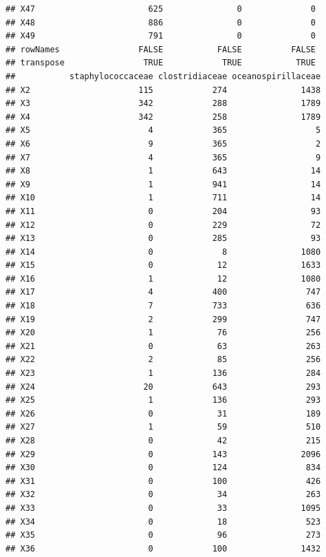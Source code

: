 \documentclass[12pt]{beamer}\usepackage[]{graphicx}\usepackage[]{color}
\makeatletter
\newenvironment{kframe}{%
 \def\at@end@of@kframe{}%
 \ifinner\ifhmode%
  \def\at@end@of@kframe{\end{minipage}}%
  \begin{minipage}{\columnwidth}%
 \fi\fi%
 \def\FrameCommand##1{\hskip\@totalleftmargin \hskip-\fboxsep
 \colorbox{shadecolor}{##1}\hskip-\fboxsep
     \hskip-\linewidth \hskip-\@totalleftmargin \hskip\columnwidth}%
 \MakeFramed {\advance\hsize-\width
   \@totalleftmargin\z@ \linewidth\hsize
   \@setminipage}}%
 {\par\unskip\endMakeFramed%
 \at@end@of@kframe}
\newenvironment{knitrout}{}{} %
\makeatother
\begin{document}
\begin{frame}[fragile]
\begin{knitrout}
\begin{kframe}
\begin{verbatim}
## X47                       625               0              0
## X48                       886               0              0
## X49                       791               0              0
## rowNames                FALSE           FALSE          FALSE
## transpose                TRUE            TRUE           TRUE
##           staphylococcaceae clostridiaceae oceanospirillaceae
## X2                      115            274               1438
## X3                      342            288               1789
## X4                      342            258               1789
## X5                        4            365                  5
## X6                        9            365                  2
## X7                        4            365                  9
## X8                        1            643                 14
## X9                        1            941                 14
## X10                       1            711                 14
## X11                       0            204                 93
## X12                       0            229                 72
## X13                       0            285                 93
## X14                       0              8               1080
## X15                       0             12               1633
## X16                       1             12               1080
## X17                       4            400                747
## X18                       7            733                636
## X19                       2            299                747
## X20                       1             76                256
## X21                       0             63                263
## X22                       2             85                256
## X23                       1            136                284
## X24                      20            643                293
## X25                       1            136                293
## X26                       0             31                189
## X27                       1             59                510
## X28                       0             42                215
## X29                       0            143               2096
## X30                       0            124                834
## X31                       0            100                426
## X32                       0             34                263
## X33                       0             33               1095
## X34                       0             18                523
## X35                       0             96                273
## X36                       0            100               1432

\end{verbatim}
\end{kframe}
\end{knitrout}
\end{frame}
\end{document}

